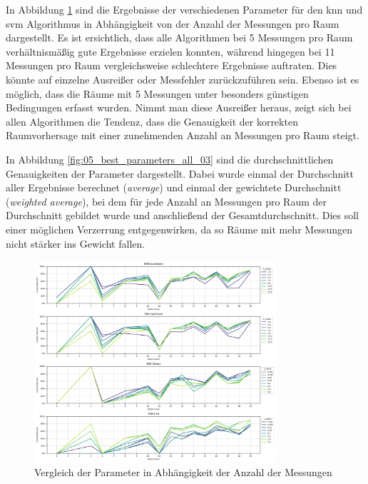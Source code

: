 In Abbildung \ref{fig:05_best_parameters_all_01} sind die Ergebnisse der verschiedenen Parameter für den \gls{knn} und \gls{svm} Algorithmus in Abhängigkeit von der Anzahl der Messungen pro Raum dargestellt. Es ist ersichtlich, dass alle Algorithmen bei 5 Messungen pro Raum verhältnismäßig gute Ergebnisse erzielen konnten, während hingegen bei 11 Messungen pro Raum vergleichsweise schlechtere Ergebnisse auftraten. Dies könnte auf einzelne Ausreißer oder Messfehler zurückzuführen sein. Ebenso ist es möglich, dass die Räume mit 5 Messungen unter besonders günstigen Bedingungen erfasst wurden. Nimmt man diese Ausreißer heraus, zeigt sich bei allen Algorithmen die Tendenz, dass die Genauigkeit der korrekten Raumvorhersage mit einer zunehmenden Anzahl an Messungen pro Raum steigt.

In Abbildung \ref{fig:05_best_parameters_all_03} sind die durchschnittlichen Genauigkeiten der Parameter dargestellt. Dabei wurde einmal der Durchschnitt aller Ergebnisse berechnet (\textit{average}) und einmal der gewichtete Durchschnitt (\textit{weighted average}), bei dem für jede Anzahl an Messungen pro Raum der Durchschnitt gebildet wurde und anschließend der Gesamtdurchschnitt. Dies soll einer möglichen Verzerrung entgegenwirken, da so Räume mit mehr Messungen nicht stärker ins Gewicht fallen.

\begin{figure}[H]
    \centering
    \includegraphics[width=0.8\textwidth]{images/05_best_parameters_all_01.png}
    \caption{Vergleich der Parameter in Abhängigkeit der Anzahl der Messungen}
    \label{fig:05_best_parameters_all_01}
\end{figure}

